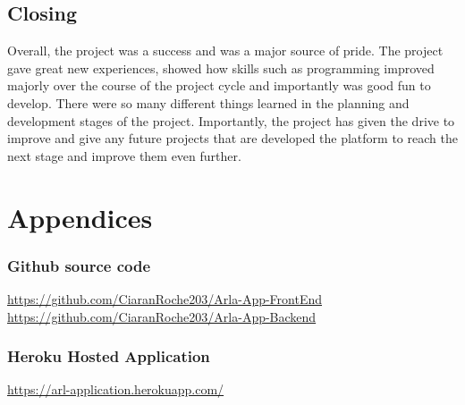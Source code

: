 \section{Closing}

Overall, the project was a success and was a major source of pride. The project gave great new experiences, showed how skills such as programming improved majorly over the course of the project cycle and importantly was good fun to develop. There were so many different things learned in the planning and development stages of the project. Importantly, the project has given the drive to improve and give any future projects that are developed the platform to reach the next stage and improve them even further. 

\chapter{Appendices}

\subsection{Github source code}
\url{https://github.com/CiaranRoche203/Arla-App-FrontEnd}\\
\url{https://github.com/CiaranRoche203/Arla-App-Backend}\\

\subsection{Heroku Hosted Application}
\url{https://arl-application.herokuapp.com/}\\
